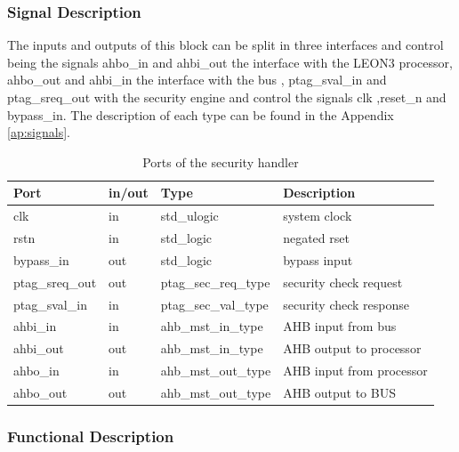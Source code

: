 \subsubsection{Signal Description}

The inputs and outputs of this block can be split in three interfaces and control being
the signals  ahbo\_in and ahbi\_out the interface with the LEON3 processor,  ahbo\_out  and ahbi\_in
the interface with the bus , ptag\_sval\_in and ptag\_sreq\_out with the security engine  and control
 the signals clk ,reset\_n and bypass\_in.
 The description of each type can be found in the Appendix \ref{ap:signals}.
\begin{table}[H]
\centering
\label{table:shports}
\begin{tabular}{l l l l}
\textbf{Port}   & \textbf{in/out} & \textbf{Type}        & \textbf{Description} 	\\ \hline \hline
clk             & in              & std\_ulogic          & system clock         	\\ \hline
rstn            & in              & std\_logic           & negated rset         	\\ \hline
bypass\_in      & out             & std\_logic           & bypass input         	\\ \hline
ptag\_sreq\_out & out             & ptag\_sec\_req\_type & security check request    	\\ \hline
ptag\_sval\_in  & in              & ptag\_sec\_val\_type & security check response  	\\ \hline
ahbi\_in        & in              & ahb\_mst\_in\_type   & AHB input from bus      	\\ \hline
ahbi\_out       & out             & ahb\_mst\_in\_type   & AHB output to processor      \\ \hline
ahbo\_in        & in              & ahb\_mst\_out\_type  & AHB input from processor    \\ \hline
ahbo\_out       & out             & ahb\_mst\_out\_type  & AHB output to BUS            \\ \hline
\end{tabular}
 \caption{Ports of the security handler}
\end{table}





\subsubsection{Functional Description}


